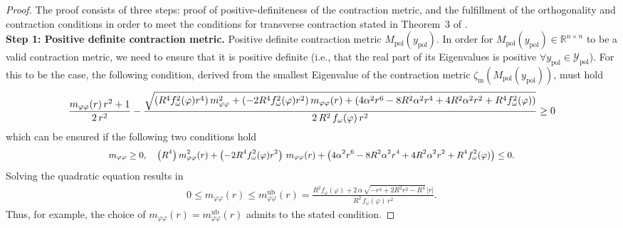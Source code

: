 \begin{proof} The proof consists of three steps: proof of positive-definiteness of the contraction metric, and the fulfillment of the orthogonality and contraction conditions in order to meet the conditions for transverse contraction stated in Theorem~3 of \citet{manchester2014transverse}.\\
    \textbf{Step 1: Positive definite contraction metric.} Positive definite contraction metric $M_\mathrm{pol}(y_\mathrm{pol})$. In order for $M_\mathrm{pol}(y_\mathrm{pol}) \in \mathbb{R}^{n \times n}$ to be a valid contraction metric, we need to ensure that it is positive definite (i.e., that the real part of its Eigenvalues is positive $\forall y_\mathrm{pol} \in \mathcal{Y}_\mathrm{pol}$). 
    For this to be the case, the following condition, derived from the smallest Eigenvalue of the contraction metric $\zeta_\mathrm{m}(M_\mathrm{pol}(y_\mathrm{pol}))$, must hold
    \begin{equation}\footnotesize
        \frac{m_{\varphi \varphi}(r) \, r^2 + 1}{2 \, r^2} - \frac{\sqrt{\left ( R^4 f_\omega^2(\varphi) r^4 \right ) m_{\varphi \varphi}^2 + \left ( -2 R^4 f_\omega^2(\varphi) r^2 \right ) m_{\varphi \varphi}(r) + \left ( 4 \alpha^2 r^6 - 8 R^2 \alpha^2 r^4 + 4 R^2 \alpha^2 r^2 + R^4 f_\omega^2(\varphi) \right )}}{2 \, R^2 \, f_\omega(\varphi) \, r^2} \geq 0
    \end{equation}
    which can be ensured if the following two conditions hold
    \begin{equation}\small
    \begin{split}
        m_{\varphi \varphi} \geq 0,
        \quad
        \left ( R^4 \right ) m_{\varphi \varphi}^2(r) + \left ( -2 R^4 f_\omega^2(\varphi) r^2 \right ) \, m_{\varphi \varphi}(r) + \left ( 4 \alpha^2 r^6 - 8 R^2 \alpha^2 r^4 + 4 R^2 \alpha^2 r^2 + R^4 f_\omega^2(\varphi) \right ) \leq 0.\\
    \end{split}
    \end{equation}
    Solving the quadratic equation results in
    \begin{equation}
    \begin{split}
        0 \leq m_{\varphi \varphi}(r) \leq m_{\varphi \varphi}^\mathrm{ub}(r) = \frac{R^2 f_\omega(\varphi) + 2 \, \alpha \, \sqrt{- r^4 + 2R^2 r^2 -R^4 } \, |r|}{R^2 \, f_\omega(\varphi) \, r^2}.
    \end{split}
    \end{equation}
    Thus, for example, the choice of $m_{\varphi \varphi}(r) = m_{\varphi \varphi}^\mathrm{ub}(r)$ admits to the stated condition.

\end{proof}
